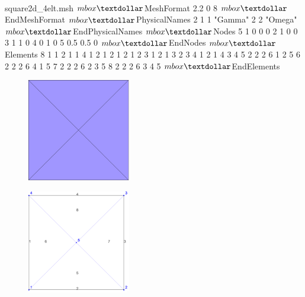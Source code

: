 \documentclass[english,10pt,a4paper]{article}
\newcommand{\dollar}{mbox{\textdollar}}
\begin{document}
\paragraph{}
\begin{minipage}[c]{0.4\linewidth}

\begin{mycpplistingInTabular}{square2d\_4elt.msh}
$\dollar$MeshFormat
2.2 0 8
$\dollar$EndMeshFormat
$\dollar$PhysicalNames
2
1 1 "Gamma"
2 2 "Omega"
$\dollar$EndPhysicalNames
$\dollar$Nodes
5
1 0 0 0
2 1 0 0
3 1 1 0
4 0 1 0
5 0.5 0.5 0
$\dollar$EndNodes
$\dollar$Elements
8
1 1 2 1 1 4 1
2 1 2 1 2 1 2
3 1 2 1 3 2 3
4 1 2 1 4 3 4
5 2 2 2 6 1 2 5
6 2 2 2 6 4 1 5
7 2 2 2 6 2 3 5
8 2 2 2 6 3 4 5
$\dollar$EndElements
\end{mycpplistingInTabular}

\end{minipage} \hfill
\begin{minipage}[c]{0.6\linewidth}
\begin{figure}[H]
  \centering
  \includegraphics[width=0.4\textwidth]{images/square2d_4elt.png}
\end{figure}
\begin{figure}[H]
  \centering
  \vspace*{-0.05\textwidth}
  \includegraphics[width=0.4\textwidth]{images/square2d_4elt_numbering.png}
\end{figure}
\end{minipage}
\end{document}

